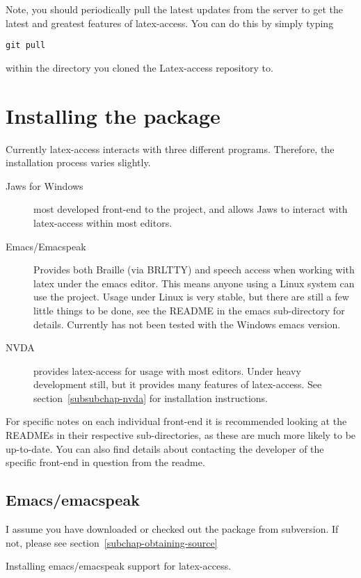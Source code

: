 \documentclass[12pt,a4paper]{report}
\begin{document}
Note, you should periodically pull the latest updates from the server to
get the latest and greatest features of latex-access. You can do this by simply typing
\begin{verbatim}
git pull
\end{verbatim}
within the directory you cloned the Latex-access repository to.

\section{Installing the package}

Currently latex-access interacts with three different
programs. Therefore, the installation process varies slightly.

\begin{description}
\item [Jaws for Windows] most developed front-end to the project, and
  allows Jaws to interact with latex-access within most editors.
\item [Emacs/Emacspeak] Provides both Braille (via BRLTTY) and speech access when
    working with latex under the emacs editor. This means anyone using a
    Linux system can use the project. Usage under Linux is very stable,
    but there are still a few little things to be done, see the README
    in the emacs sub-directory for details. Currently has not been tested with
    the Windows emacs version.
\item [NVDA] provides latex-access for usage with most
      editors. Under heavy development still, but it provides many
      features of latex-access. See section~\ref{subsubchap-nvda} for
      installation instructions.
\end{description}

For specific notes on each individual front-end it is recommended looking at the
READMEs in their respective sub-directories, as these are much more likely to be up-to-date. You can also find details about
contacting the developer of the specific front-end in question from the readme.

\subsection{Emacs/emacspeak}
\label{subsubchap-emacs}

I assume you have downloaded or checked out the package from
subversion. If not, please see section~\ref{subchap-obtaining-source}

Installing emacs/emacspeak support for latex-access.
\end{document}
